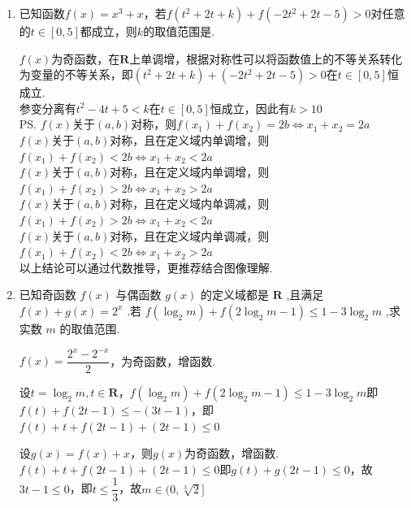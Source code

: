 \begin{enumerate}
\begin{jieda}
        函数在 $x = 0$ 处连续,又 $f\left( x\right)$ 是定义域为 $\mathbf{R}$ 的奇函数,故 $f\left( x\right)$ 在 $\mathbf{R}$ 上单调递增.
        
        因为 $f\left( {-x}\right)  =  - f\left( x\right)$ ,由 $f\left( {3 + m}\right)  + f\left( {{3m} - 7}\right)  > 0$ ,可得 $f\left( {3 + m}\right)  > f\left( {7 - {3m}}\right)$ ,
        
        又因为 $f\left( x\right)$ 在 $\mathbf{R}$ 上单调递增,所以 $3 + m > 7 - {3m}$ ,解得 $m > 1$ .
    \end{jieda}
    \item 已知函数$f(x) = x^3+x$，若$f(t^2+2t+k)+f(-2t^2+2t-5)>0$对任意的$t \in [0, 5]$都成立，则$k$的取值范围是.
    \begin{jieda}
        $f(x)$为奇函数，在$\mathbf{R}$上单调增，根据对称性可以将函数值上的不等关系转化为变量的不等关系，即$(t^2+2t+k)+(-2t^2+2t-5)>0$在$t \in [0, 5]$恒成立.\\
        参变分离有$t^2-4t+5 < k$在$t \in [0, 5]$恒成立，因此有$k > 10$ \\
        \ps $f(x)$关于$(a, b)$对称，则$f(x_1) + f(x_2) = 2b \Longleftrightarrow x_1 + x_2 = 2a$ \\
        $f(x)$关于$(a, b)$对称，且在定义域内单调增，则$f(x_1) + f(x_2) < 2b \Longleftrightarrow x_1 + x_2 < 2a$ \\
        $f(x)$关于$(a, b)$对称，且在定义域内单调增，则$f(x_1) + f(x_2) > 2b \Longleftrightarrow x_1 + x_2 > 2a$ \\
        $f(x)$关于$(a, b)$对称，且在定义域内单调减，则$f(x_1) + f(x_2) > 2b \Longleftrightarrow x_1 + x_2 < 2a$ \\
        $f(x)$关于$(a, b)$对称，且在定义域内单调减，则$f(x_1) + f(x_2) < 2b \Longleftrightarrow x_1 + x_2 > 2a$ \\
        以上结论可以通过代数推导，更推荐结合图像理解.
    \end{jieda}
    
    \item 已知奇函数 $f\left( x\right)$ 与偶函数 $g\left( x\right)$ 的定义域都是 $\mathbf{R}$ ,且满足 $f\left( x\right)  + g\left( x\right)  = {2}^{x}$ .若 $f\left( {{\log }_{2}m}\right)  + f\left( {2{\log }_{2}m - 1}\right)  \leq  1 - 3{\log }_{2}m$ ,求实数 $m$ 的取值范围.
    \begin{jieda}
        $f(x) = \dfrac{2^x-2^{-x}}{2}$，为奇函数，增函数.

        设$t = {\log }_{2}m, t\in \mathbf{R}$，$f\left( {{\log }_{2}m}\right)  + f\left( {2{\log }_{2}m - 1}\right)  \leq  1 - 3{\log }_{2}m$即$f(t) + f(2t-1) \leq -(3t-1)$，即$f(t)+t + f(2t-1)+(2t-1) \leq 0$

        设$g(x) = f(x)+x$，则$g(x)$为奇函数，增函数.$f(t)+t + f(2t-1)+(2t-1) \leq 0$即$g(t)+g(2t-1) \leq 0$，故$3t-1 \leq 0$，即$t \leq \dfrac{1}{3}$，故$m \in (0, \sqrt[3]{2}]$
    \end{jieda}
\end{enumerate}

